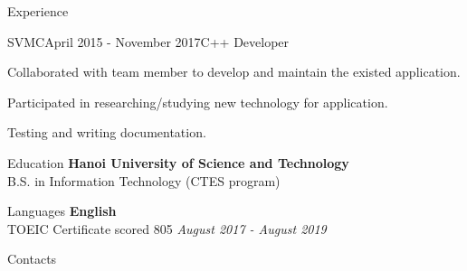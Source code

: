 \documentclass{resume}
\begin{document}
\begin{rSection}{Experience}
    \begin{rSubsection}{SVMC}{April 2015 - November 2017}{C++ Developer}{}
      \item Collaborated with team member to develop and maintain the existed application.
      \item Participated in researching/studying new technology for application.
      \item Testing and writing documentation.
    \end{rSubsection}

  
  \end{rSection}

  \newpage

  \begin{rSection}{Education}
    {\bf Hanoi University of Science and Technology} \\ 
    { B.S. in Information Technology (CTES program) } \\
  \end{rSection}


  \begin{rSection}{Languages}
    {\bf English} \\ 
    { TOEIC Certificate scored 805  } \hfill {\em August 2017 - August 2019} \\
  \end{rSection}

  \begin{rSection}{Contacts}
  \end{rSection}
\end{document}
